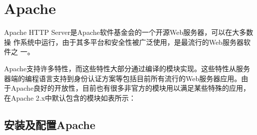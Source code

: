\chapter{Apache}
\label{chap:apache}

Apache HTTP Server是Apache软件基金会的一个开源Web服务器，可以在大多数操
作系统中运行，由于其多平台和安全性被广泛使用，是最流行的Web服务器软件之
一。

Apache支持许多特性，而这些特性大部分通过编译的模块实现。这些特性从服务
器端的编程语言支持到身份认证方案等包括目前所有流行的Web服务器应用。由
于Apache良好的开放性，目前也有很多非官方的模块用以满足某些特殊的应用，
在Apache 2.x中默认包含的模块如表所示：

\section{安装及配置Apache}
\label{subsec:InstallApache}

